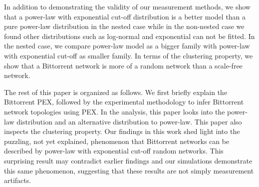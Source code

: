 \documentclass[paper]{ieice}
\begin{document}

In addition to demonstrating the validity of our measurement methods, we show that a power-law with exponential cut-off distribution is a better model than a pure power-law distribution in the nested case while in the non-nested case we found other distributions such as log-normal and exponential can not be fitted.
In the nested case, we compare power-law model as a bigger family with power-law with exponential cut-off as smaller family. 
In terms of the clustering property, we show that a Bittorrent network is more of a random network than a scale-free network. 

The rest of this paper is organized as follows. We first briefly explain the Bittorrent PEX, followed by the experimental methodology to infer Bittorrent network topologies using PEX. 
In the analysis, this paper looks into the power-law distribution and an alternative distribution to power-law. 
This paper also inspects the clustering property.
Our findings in this work shed light into the puzzling, not yet explained, phenomenon that Bittorrent networks can be described by power-law with exponential cut-off random networks.
This surprising result may contradict earlier findings and our simulations demonstrate this same phenomenon, suggesting that these results are not simply measurement artifacts.
\end{document}
